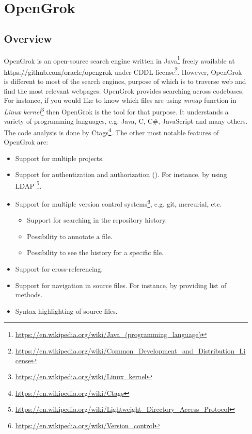 \chapter{OpenGrok}
\label{chap:opengrok}

\section{Overview}
\label{opengrok_overview}
OpenGrok is an open-source search engine written in
Java\footnote{\url{https://en.wikipedia.org/wiki/Java\_(programming\_language)}}
freely available at \url{https://github.com/oracle/opengrok} under CDDL
license\footnote{\url{https://en.wikipedia.org/wiki/Common\_Development\_and\_Distribution\_License}}.
However, OpenGrok is different to most of the search engines, purpose of which is to traverse web and find the most relevant
webpages. OpenGrok provides searching across codebases. For instance, if you would like to know which files are using
\textit{mmap} function in \textit{Linux kernel}\footnote{\url{https://en.wikipedia.org/wiki/Linux\_kernel}} then
OpenGrok is the tool for that purpose. It understands a variety of
programming languages, e.g. Java, C, C\#, JavaScript and many others. The code analysis is done by
Ctags\footnote{\url{https://en.wikipedia.org/wiki/Ctags}}.
The other most notable features of OpenGrok are:
\begin{itemize}
    \item Support for multiple projects.
    \item Support for authentization and authorization (\cite{OpengrokAuthLayer}). For instance, by using LDAP
        \footnote{\url{https://en.wikipedia.org/wiki/Lightweight_Directory_Access_Protocol}}.
    \item Support for multiple version control systems\footnote{\url{https://en.wikipedia.org/wiki/Version\_control}},
        e.g. git, mercurial, etc.
        \begin{itemize}
            \item Support for searching in the repository history.
            \item Possibility to annotate a file.
            \item Possibility to see the history for a specific file.
        \end{itemize}
    \item Support for cross-referencing.
    \item Support for navigation in source files. For instance, by providing list of methods.
    \item Syntax highlighting of source files.
\end{itemize}

